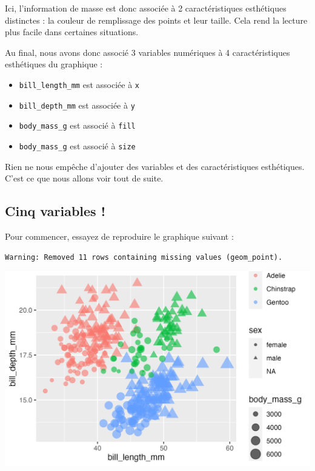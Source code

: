 \documentclass[
  letterpaper,
  DIV=11,
  numbers=noendperiod]{scrreprt}
\providecommand{\tightlist}{%
  \setlength{\itemsep}{0pt}\setlength{\parskip}{0pt}}\usepackage{longtable,booktabs,array}
\begin{document}
Ici, l'information de masse est donc associée à 2 caractéristiques
esthétiques distinctes : la couleur de remplissage des points et leur
taille. Cela rend la lecture plus facile dans certaines situations.

Au final, nous avons donc associé 3 variables numériques à 4
caractéristiques esthétiques du graphique :

\begin{itemize}
\tightlist
\item
  \texttt{bill\_length\_mm} est associée à \texttt{x}
\item
  \texttt{bill\_depth\_mm} est associée à \texttt{y}
\item
  \texttt{body\_mass\_g} est associé à \texttt{fill}
\item
  \texttt{body\_mass\_g} est associé à \texttt{size}
\end{itemize}

Rien ne nous empêche d'ajouter des variables et des caractéristiques
esthétiques. C'est ce que nous allons voir tout de suite.

\hypertarget{cinq-variables}{%
\subsection{Cinq variables !}\label{cinq-variables}}

Pour commencer, essayez de reproduire le graphique suivant :

\begin{verbatim}
Warning: Removed 11 rows containing missing values (geom_point).
\end{verbatim}

\includegraphics{./03-visualization_files/figure-pdf/unnamed-chunk-78-1.png}
\end{document}
